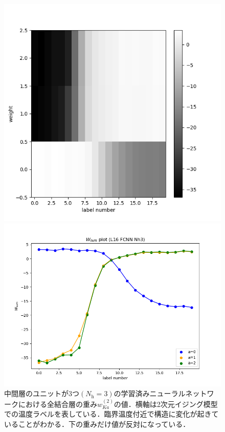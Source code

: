 \documentclass[a4paper,11pt]{jsreport}
\begin{document}
\begin{figure}[H]
  \begin{minipage}[b]{0.45\linewidth}
    \begin{center}
      \includegraphics[keepaspectratio, scale=0.4]{image/温度測定器2_L16_FCN_Nh3_pram.png}
    \end{center}
  \end{minipage}
  \begin{minipage}[b]{0.45\linewidth}
    \begin{center}
      \includegraphics[keepaspectratio, scale=0.4]{image/温度測定器2_L16_FCN_Nh3_weight_plot.png}
    \end{center}
  \end{minipage}
  \caption{中間層のユニットが3つ$(N_{\text{h}}=3)$の学習済みニューラルネットワークにおける全結合層の重み$w_{Ka}^{(2)}$の値．横軸は2次元イジング模型での温度ラベルを表している．臨界温度付近で構造に変化が起きていることがわかる．下の重みだけ値が反対になっている．}
  \label{温度測定器FCN2重みプロット}
\end{figure}
\end{document}
